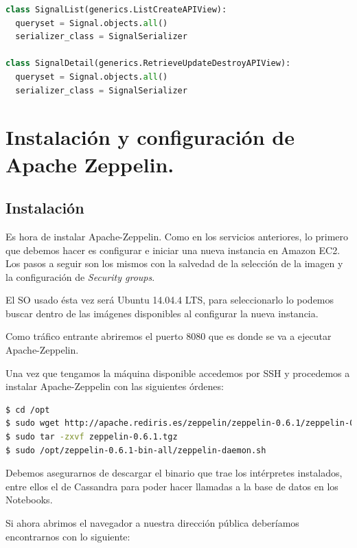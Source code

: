 \begin{lstlisting}[language=python,caption={Vistas de la API},label={lst:pi1}]
class SignalList(generics.ListCreateAPIView):
  queryset = Signal.objects.all()
  serializer_class = SignalSerializer

class SignalDetail(generics.RetrieveUpdateDestroyAPIView):
  queryset = Signal.objects.all()
  serializer_class = SignalSerializer
\end{lstlisting}

\newpage


\section{Instalación y configuración de Apache Zeppelin.}

\subsection{Instalación}
Es hora de instalar Apache-Zeppelin. Como en los servicios anteriores, lo primero que debemos hacer es configurar e iniciar una nueva instancia en Amazon EC2. Los pasos a seguir son los mismos con la salvedad de la selección de la imagen y la configuración de \textit{Security groups}.

\bigskip

El SO usado ésta vez será Ubuntu 14.04.4 LTS, para seleccionarlo lo podemos buscar dentro de las imágenes disponibles al configurar la nueva instancia.

Como tráfico entrante abriremos el puerto 8080 que es donde se va a ejecutar Apache-Zeppelin.

Una vez que tengamos la máquina disponible accedemos por SSH y procedemos a instalar Apache-Zeppelin con las siguientes órdenes:

\begin{lstlisting}[language=bash,caption={Instalación de Apache-Zeppelin},label={lst:pi1}]
$ cd /opt
$ sudo wget http://apache.rediris.es/zeppelin/zeppelin-0.6.1/zeppelin-0.6.1.tgz
$ sudo tar -zxvf zeppelin-0.6.1.tgz
$ sudo /opt/zeppelin-0.6.1-bin-all/zeppelin-daemon.sh
\end{lstlisting}

Debemos asegurarnos de descargar el binario que trae los intérpretes instalados, entre ellos el de Cassandra para poder hacer llamadas a la base de datos en los Notebooks.

Si ahora abrimos el navegador a nuestra dirección pública deberíamos encontrarnos con lo siguiente:

